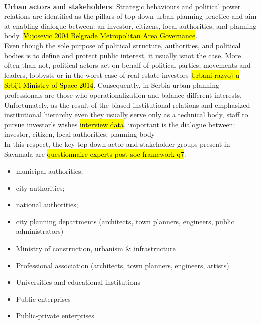 \documentclass[11pt]{report}
\begin{document}
\begin{itemize}
\\
\textbf{Urban actors and stakeholders}:
Strategic behaviours and political power relations are identified as the pillars of top-down urban planning practice and aim at enabling dialogue between: an investor, citizens, local authorities, and planning body.
\hl{Vujosevic 2004 Belgrade Metropolitan Area Governance}.
\\
Even though the sole purpose of political structure, authorities, and political bodies is to define and protect public interest, it usually isnot the case. More often than not, political actors act on behalf of political parties, movements and leaders, lobbysts or in the worst case of real estate investors \hl{Urbani razvoj u Srbiji Ministry of Space 2014}. Consequently, in Serbia urban planning professionals are those who operationalization and balance different interests. Unfortunately, as the result of the biased institutional relations and emphasized institutional hierarchy even they usually serve only as a technical body, staff to pursue investor's wishes \hl{interview data}.
important is the dialogue between: investor, citizen, local authorities, planning body
\\
In this respect, the key top-down actor and stakeholder groups present in Savamala are \hl{questionnaire experts post-soc framework q7}:
\begin{itemize}
\item municipal authorities;
\item city authorities;
\item national authorities;
\item city planning departments (architects, town planners, engineers, public administrators)
\item Ministry of construction, urbanism \& infrastructure
\item Professional association (architects, town planners, engineers, artists)
\item Universities and educational institutions
\item Public enterprises
\item Public-private enterprises
\end{itemize}


\end{itemize}
\end{document}
